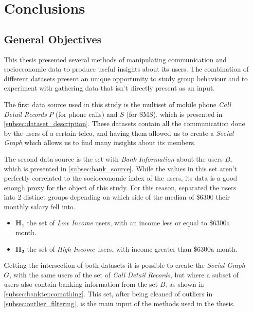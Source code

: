 \chapter{Conclusions}
\label{chap:conclusions}

\section{General Objectives}

This thesis presented several methods of manipulating communication and socioeconomic data to produce useful insights about its users.
The combination of different datasets present an unique opportunity to study group behaviour and to experiment with gathering data that isn't directly present as an input.

The first data source used in this study is the multiset of mobile phone \emph{Call Detail Records} $P$ (for phone calls) and $S$ (for SMS), which is presented in \cref{subsec:dataset_description}.
These datasets contain all the communication done by the users of a certain telco, and having them allowed us to create a \emph{Social Graph} which allows us to find many insights about its members.

The second data source is the set with \emph{Bank Information} about the users $B$, which is presented in \cref{subsec:bank_source}.
While the values in this set aren't perfectly correlated to the socioeconomic index of the users, its data is a good enough proxy for the object of this study.
For this reason, separated the users into 2 distinct groups depending on which side of the median of \$6300\footnotemark{} their monthly salary fell into.

\begin{itemize}
	\item $\mathbf{H_1}$ the set of \emph{Low Income} users, with an income less or equal to \$6300\footnotemark[\value{footnote}] a month.
	\item $\mathbf{H_2}$ the set of \emph{High Income} users, with income greater than \$6300\footnotemark[\value{footnote}] a month.
\end{itemize}

Getting the intersection of both datasets it is possible to create the \emph{Social Graph} $G$, with the same users of the set of \emph{Call Detail Records}, but where a subset of users also contain banking information from the set $B$, as shown in \cref{subsec:banktencomathing}.
This set, after being cleaned of outliers in \cref{subsec:outlier_filtering}, is the main input of the methods used in the thesis.

